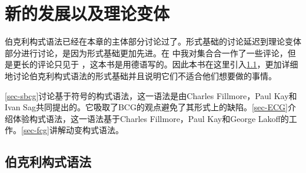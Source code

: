 \section{新的发展以及理论变体}

伯克利构式语法已经在本章的主体部分讨论过了。形式基础的讨论延迟到理论变体部分进行讨论，是因为形式基础更加先进。在 中我对集合合一作了一些评论，但是更长的评论只见于 ，这本书是用德语写的。因此本书在这里引入\ref{sec-formal-bcg}，更加详细地讨论伯克利构式语法的形式基础并且说明它们不适合他们想要做的事情。

\ref{sec-sbcg}讨论基于符号的构式语法，这一语法是由Charles Fillmore，Paul Kay和Ivan Sag共同提出的。它吸取了BCG的观点避免了其形式上的缺陷。\ref{sec-ECG}介绍体验构式语法，这一语法基于Charles Fillmore，Paul Kay和George Lakoff的工作。\ref{sec-fcg}讲解动变构式语法。

\subsection{伯克利构式语法}
\label{sec-formal-bcg}

